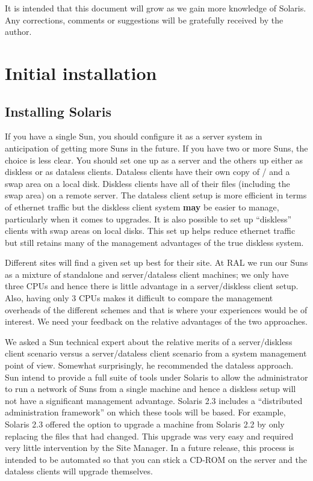 It is intended that this document will grow as we gain more knowledge
of Solaris. Any corrections, comments or suggestions will be
gratefully received by the author. 


\section{Initial installation}

\subsection{Installing Solaris}

If you have a single Sun, you should configure it as a server system in
anticipation of getting more Suns in the future. If you have two
or more Suns, the choice is less clear. You should set one up as a
server and the others up either as diskless or as dataless clients.
Dataless clients have their own copy of / and a swap area on a local disk.
Diskless clients have all of their files (including the swap area) on a 
remote server. The dataless client setup is more efficient in terms of
ethernet traffic but the diskless client system {\bf may} be easier to manage, 
particularly when it comes to upgrades. It is also possible to set up 
``diskless'' clients with swap areas on local disks. This set up helps
reduce ethernet traffic but still retains many of the management
advantages of the true diskless system. 

Different sites will find a given set up best for their site.
At RAL we run our Suns as a mixture of standalone and server/dataless client
machines; we only have three CPUs and hence there is little advantage in
a server/diskless client setup. Also, having only 3 CPUs makes it difficult to
compare the management overheads of the different schemes and that is where
your experiences would be of interest. We need your feedback on the
relative advantages of the two approaches. 

We asked a Sun technical expert about the relative merits of a
server/diskless client scenario versus a server/dataless client scenario
from a system management point of view. Somewhat surprisingly, he
recommended the dataless approach. Sun intend to provide a full suite
of tools under Solaris to allow the administrator to run a network of
Suns from a single machine and hence a diskless setup will not have a
significant management advantage. Solaris 2.3 includes a ``distributed
administration framework'' on which these tools will be based.  For
example, Solaris 2.3 offered the option to upgrade a machine from
Solaris 2.2 by only replacing the files that had changed. This upgrade was
very easy and required very little intervention by the Site Manager. 
In a future
release, this process is intended to be automated so that you can stick
a CD-ROM on the server and the dataless clients will upgrade
themselves.


